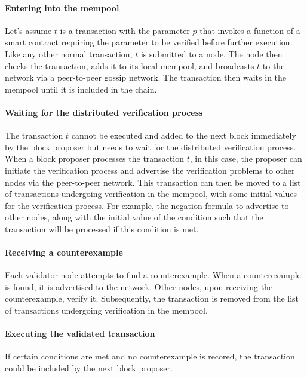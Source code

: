 \documentclass[runningheads]{llncs}
\begin{document}
\paragraph{Entering into the mempool} Let's assume $t$ is a transaction with the parameter $p$ that invokes a function of a smart contract requiring the parameter to be verified before further execution. Like any other normal transaction, $t$ is submitted to a node. The node then checks the transaction, adds it to its local mempool, and broadcasts $t$ to the network via a peer-to-peer gossip network. The transaction then waits in the mempool until it is included in the chain.
\paragraph{Waiting for the distributed verification process} The transaction $t$ cannot be executed and added to the next block immediately by the block proposer but needs to wait for the distributed verification process. When a block proposer processes the transaction $t$, in this case, the proposer can initiate the verification process and advertise the verification problems to other nodes via the peer-to-peer network. This transaction can then be moved to a list of transactions undergoing verification in the mempool, with some initial values for the verification process. For example, the negation formula to advertise to other nodes, along with the initial value of the condition such that the transaction will be processed if this condition is met.
\paragraph{Receiving a counterexample} Each validator node attempts to find a counterexample. When a counterexample is found, it is advertised to the network. Other nodes, upon receiving the counterexample, verify it. Subsequently, the transaction is removed from the list of transactions undergoing verification in the mempool. 
\paragraph{Executing the validated transaction} If certain conditions are met and no counterexample is recored, the transaction could be included by the next block proposer.
\end{document}
